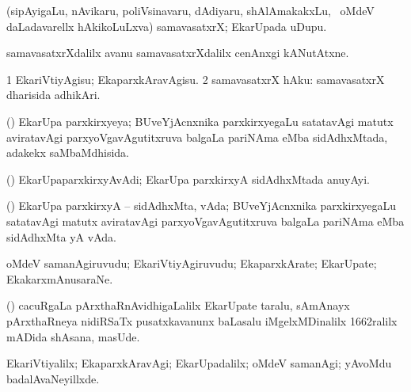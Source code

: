 {\bentry
{} 
\gl{\nA}
\expl{}
\bmng
(sipAyigaLu, nAvikaru, poliVsinavaru, dAdiyaru, shAlAmakakxLu, \mo\ oMdeV daLadavarellx hAkikoLuLxva) samavasatxrX; EkarUpada uDupu. 
\emng

\noindent
\gl{\pagu}
\expl{}
\bmng
{} samavasatxrXdalilx  avanu samavasatxrXdalilx cenAnxgi kANutAtxne. 
\emng
\eentry

\bentry
{} 
\gl{\sakirx}
\expl{}
\bmng
\bnum
\num{1} EkariVtiyAgisu; EkaparxkAravAgisu. 
\num{2} samavasatxrX hAku:  samavasatxrX dharisida adhikAri. 
\enum
\emng
\eentry

\bentry
{} 
\gl{\gu}
\expl{}
\bmng
(\BUvi) EkarUpa parxkirxyeya; BUveYjAcnxnika parxkirxyegaLu satatavAgi matutx aviratavAgi parxyoVgavAgutitxruva balgaLa pariNAma eMba sidAdhxMtada, adakekx saMbaMdhisida. 
\emng
\eentry

\bentry
{} 
\gl{\nA}
\expl{}
\bmng
(\BUvi) EkarUpaparxkirxyAvAdi; EkarUpa parxkirxyA sidAdhxMtada anuyAyi. 
\emng
\eentry

\bentry
{} 
\gl{\nA}
\expl{}
\bmng
(\BUvi) EkarUpa parxkirxyA -- sidAdhxMta, vAda; BUveYjAcnxnika parxkirxyegaLu satatavAgi matutx aviratavAgi parxyoVgavAgutitxruva balgaLa pariNAma eMba sidAdhxMta yA vAda. 
\emng
\eentry

\bentry
{} 
\gl{\nA}
\bmng
oMdeV samanAgiruvudu; EkariVtiyAgiruvudu; EkaparxkArate; EkarUpate; EkakarxmAnusaraNe. 
\emng

\noindent
\gl{\pagu}
\expl{}
\bmng
{} (\ca) cacuRgaLa pArxthaRnAvidhigaLalilx EkarUpate taralu, sAmAnayx pArxthaRneya nidiRSaTx pusatxkavanunx baLasalu iMgelxMDinalilx 1662ralilx mADida shAsana, masUde. 
\emng
\eentry

\bentry
{} 
\gl{\kirxvi}
\expl{}
\bmng
EkariVtiyalilx; EkaparxkAravAgi; EkarUpadalilx; oMdeV samanAgi; yAvoMdu badalAvaNeyillxde. 
\emng
\eentry

\bentry
{} 
\gl{\akirx}
}
